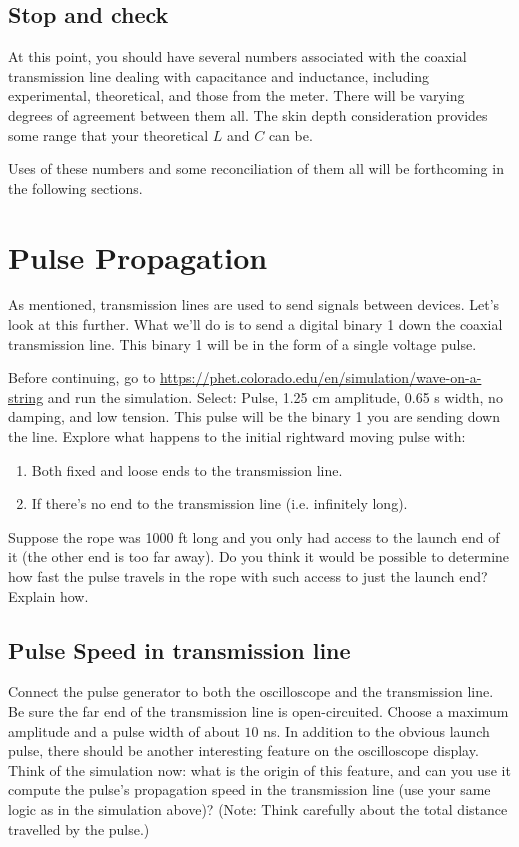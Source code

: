 \documentclass[12pt]{article}
\begin{document}
\subsection{Stop and check}

At this point, you should have several numbers associated with the coaxial transmission line dealing with capacitance and inductance, including experimental, theoretical, and those from the meter. There will be varying degrees of agreement between them all. The skin depth consideration provides some range that your theoretical $L$ and $C$ can be.

Uses of these numbers and some reconciliation of them all will be forthcoming in the following sections.

\section{Pulse Propagation}

As mentioned, transmission lines are used to send signals between devices.  Let's look at this further. What we'll do is to send a digital binary 1 down the coaxial transmission line. This binary 1 will be in the form of a single voltage pulse.

Before continuing, go to \url{https://phet.colorado.edu/en/simulation/wave-on-a-string} and run the simulation. Select: Pulse, 1.25 cm amplitude, 0.65 s width, no damping, and low tension. This pulse will be the binary 1 you are sending down the line. Explore what happens to the initial rightward moving pulse with:

\begin{enumerate}
\item Both fixed and loose ends to the transmission line.
\item If there's no end to the transmission line (i.e. infinitely long).
\end{enumerate}

Suppose the rope was 1000 ft long and you only had access to the launch end of it (the other end is too far away).  Do you think it would be possible to determine how fast the pulse travels in the rope with such access to just the launch end? Explain how.

\subsection{Pulse Speed in transmission line}

Connect the pulse generator to both the oscilloscope and the transmission line.  Be sure the far end of the transmission line is open-circuited.   Choose a maximum amplitude and a pulse width of about $10$ ns. In addition to the obvious launch pulse, there should be another interesting feature on the oscilloscope display.  Think of the simulation now: what is the origin of this feature, and can you use it compute the pulse's propagation speed in the transmission line (use your same logic as in the simulation above)? (Note: Think carefully about the total distance travelled by the pulse.)
\end{document}
